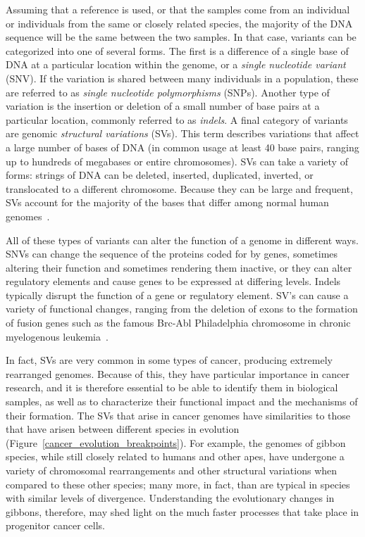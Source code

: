 Assuming that a reference is used, or that the samples come from an individual or individuals from the same or closely related species, the majority of the DNA sequence will be the same between the two samples. In that case, variants can be categorized into one of several forms. The first is a difference of a single base of DNA at a particular location within the genome, or a \emph{single nucleotide variant} (SNV). If the variation is shared between many individuals in a population, these are referred to as \emph{single nucleotide polymorphisms} (SNPs). Another type of variation is the insertion or deletion of a small number of base pairs at a particular location, commonly referred to as \emph{indels}. A final category of variants are genomic \emph{structural variations} (SVs). This term describes variations that affect a large number of bases of DNA (in common usage at least 40 base pairs, ranging up to hundreds of megabases or entire chromosomes). SVs can take a variety of forms: strings of DNA can be deleted, inserted, duplicated, inverted, or translocated to a different chromosome. Because they can be large and frequent, SVs account for the majority of the bases that differ among normal human genomes~\cite{Mills:2011p1611, Conrad:2010ja}.

All of these types of variants can alter the function of a genome in different ways. SNVs can change the sequence of the proteins coded for by genes, sometimes altering their function and sometimes rendering them inactive, or they can alter regulatory elements and cause genes to be expressed at differing levels. Indels typically disrupt the function of a gene or regulatory element. SV's can cause a variety of functional changes, ranging from the deletion of exons to the formation of fusion genes such as the famous Brc-Abl Philadelphia chromosome in chronic myelogenous leukemia~\cite{Kurzrock:2003bz}. 

In fact, SVs are very common in some types of cancer, producing extremely rearranged genomes. Because of this, they have particular importance in cancer research, and it is therefore essential to be able to identify them in biological samples, as well as to characterize their functional impact and the mechanisms of their formation. The SVs that arise in cancer genomes have similarities to those that have arisen between different species in evolution (Figure~\ref{cancer_evolution_breakpoints}). For example, the genomes of gibbon species, while still closely related to humans and other apes, have undergone a variety of chromosomal rearrangements and other structural variations when compared to these other species; many more, in fact, than are typical in species with similar levels of divergence. Understanding the evolutionary changes in gibbons, therefore, may shed light on the much faster processes that take place in progenitor cancer cells.

